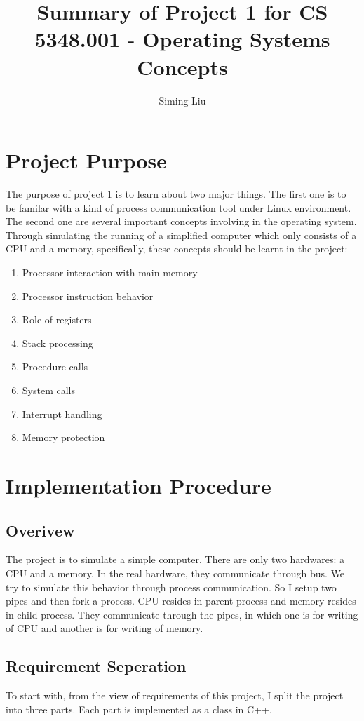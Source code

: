 \documentclass[a4paper]{report}
\begin{document}
\title{Summary of Project 1 for CS 5348.001 - Operating Systems Concepts}

\author{Siming Liu}

\maketitle{}

\section*{Project Purpose}
The purpose of project 1 is to learn about two major things. The first one is to be familar with a kind of process communication tool under Linux environment. The second one are several important concepts involving in the operating system. Through simulating the running of a simplified computer which only consists of a CPU and a memory, specifically, these concepts should be learnt in the project:
\begin{enumerate}[label=\textbf{\textit{\alph*}})]
  \item Processor interaction with main memory
  \item Processor instruction behavior
  \item Role of registers
  \item Stack processing
  \item Procedure calls
  \item System calls
  \item Interrupt handling
  \item Memory protection
\end{enumerate}

\section*{Implementation Procedure}
\subsection*{Overivew}
The project is to simulate a simple computer. There are only two hardwares: a CPU and a memory. In the real hardware, they communicate through bus. We try to simulate this behavior through process communication. So I setup two pipes and then fork a process. CPU resides in parent process and memory resides in child process. They communicate through the pipes, in which one is for writing of CPU and another is for writing of memory.

\subsection*{Requirement Seperation}
To start with, from the view of requirements of this project, I split the project into three parts. Each part is implemented as a class in C++.
\end{document}
